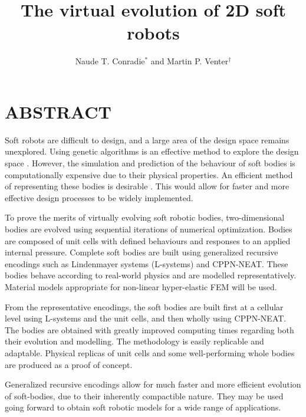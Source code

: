 \documentclass[a4paper]{sacam2020}
\title{The virtual evolution of 2D soft robots}
\author{Naude T. Conradie$^{*}$ and Martin P. Venter$^{\dag}$}
\begin{document}
\thispagestyle{empty}

\section*{ABSTRACT}

Soft robots are difficult to design, and a large area of the design space remains unexplored. Using genetic algorithms is an effective method to explore the design space \cite{Sims1994a}. However, the simulation and prediction of the behaviour of soft bodies is computationally expensive due to their physical properties. An efficient method of representing these bodies is desirable \cite{Hiller2010}. This would allow for faster and more effective design processes to be widely implemented.

To prove the merits of virtually evolving soft robotic bodies, two-dimensional bodies are evolved using sequential iterations of numerical optimization. Bodies are composed of unit cells with defined behaviours and responses to an applied internal pressure. Complete soft bodies are built using generalized recursive encodings such as Lindenmayer systems (L-systems) and CPPN-NEAT. These bodies behave according to real-world physics and are modelled representatively. Material models appropriate for non-linear hyper-elastic FEM will be used.

From the representative encodings, the soft bodies are built first at a cellular level using L-systems and the unit cells, and then wholly using CPPN-NEAT. The bodies are obtained with greatly improved computing times regarding both their evolution and modelling. The methodology is easily replicable and adaptable. Physical replicas of unit cells and some well-performing whole bodies are produced as a proof of concept.

Generalized recursive encodings allow for much faster and more efficient evolution of soft-bodies, due to their inherently compactible nature. They may be used going forward to obtain soft robotic models for a wide range of applications.



\end{document}
